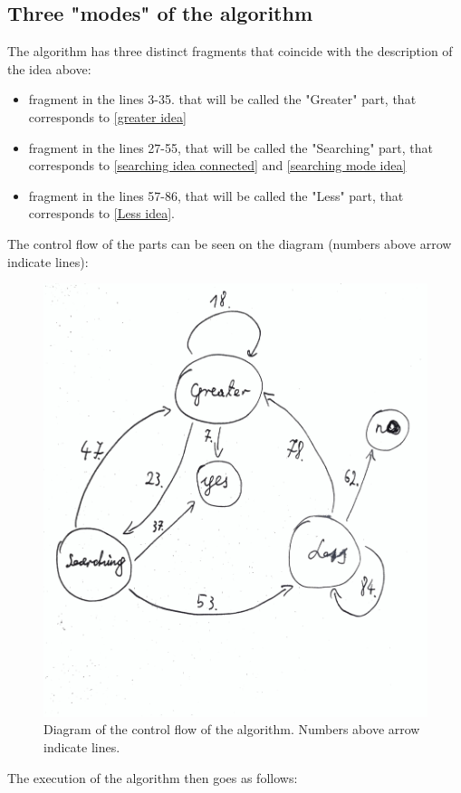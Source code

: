\subsection{Three "modes" of the algorithm}
The algorithm has three distinct fragments that coincide with 
the description of the idea above: 
\begin{itemize}
\item fragment in the lines 3-35. that will be called the "Greater" part, 
that corresponds to \ref{greater idea}
\item fragment in the lines 27-55, that will be called the "Searching" part, 
that corresponds to \ref{searching idea connected} and \ref{searching mode idea}
\item fragment in the lines 57-86, that will be called the "Less" part, that 
corresponds to \ref{Less idea}.
\end{itemize}

The control flow of the parts can be seen on the diagram (numbers above arrow indicate lines):
\begin{figure}[H]
\centering
\includegraphics[width=\textwidth]{"../searching_for_a_spectrum/control_flow.jpg"}
\caption{Diagram of the control flow of the algorithm. Numbers above arrow indicate lines.}
\end{figure}
The execution of the algorithm then goes as follows:

